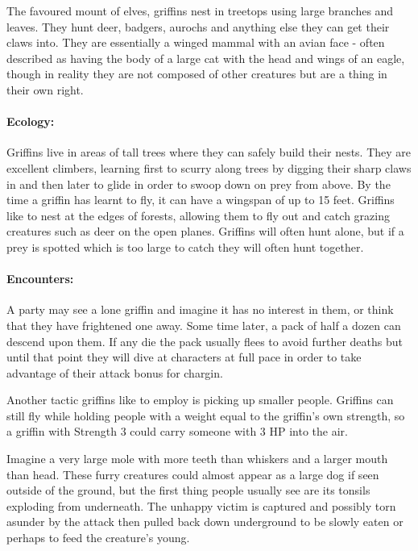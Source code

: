 \label{griffin}
\griffin

The favoured mount of elves, griffins nest in treetops using large branches and leaves.  They hunt deer, badgers, aurochs and anything else they can get their claws into.  They are essentially a winged mammal with an avian face - often described as having the body of a large cat with the head and wings of an eagle, though in reality they are not composed of other creatures but are a thing in their own right.

\paragraph{Ecology:} Griffins live in areas of tall trees where they can safely build their nests.  They are excellent climbers, learning first to scurry along trees by digging their sharp claws in and then later to glide in order to swoop down on prey from above.  By the time a griffin has learnt to fly, it can have a wingspan of up to 15 feet.  Griffins like to nest at the edges of forests, allowing them to fly out and catch grazing creatures such as deer on the open planes.  Griffins will often hunt alone, but if a prey is spotted which is too large to catch  they will often hunt together.

\paragraph{Encounters:} A party may see a lone griffin and imagine it has no interest in them, or think that they have frightened one away.  Some time later, a pack of half a dozen can descend upon them.  If any die the pack usually flees to avoid further deaths but until that point they will dive at characters at full pace in order to take advantage of their attack bonus for chargin.

Another tactic griffins like to employ is picking up smaller people.  Griffins can still fly while holding people with a weight equal to the griffin's own strength, so a griffin with Strength 3 could carry someone with 3 HP into the air.

\label{mouthdigger}
\mouthdigger

Imagine a very large mole with more teeth than whiskers and a larger mouth than head.  These furry creatures could almost appear as a large dog if seen outside of the ground, but the first thing people usually see are its tonsils exploding from underneath.  The unhappy victim is captured and possibly torn asunder by the attack then pulled back down underground to be slowly eaten or perhaps to feed the creature's young.

